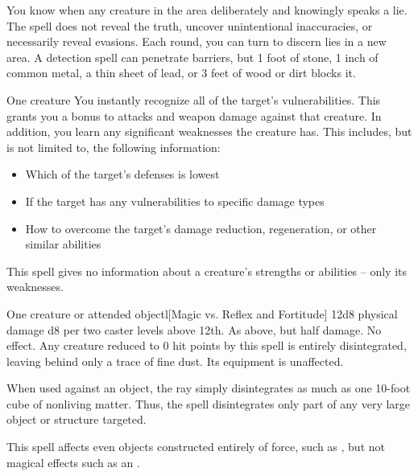 \spellline
\spelleffect You know when any creature in the area deliberately and knowingly speaks a lie. The spell does not reveal the truth, uncover unintentional inaccuracies, or necessarily reveal evasions.
\spellnotes Each round, you can turn to discern lies in a new area. A detection spell can penetrate barriers, but 1 foot of stone, 1 inch of common metal, a thin sheet of lead, or 3 feet of wood or dirt blocks it.

\spellrng{\rngmed}
\begin{spelltarget}{One creature}
    \spelleffect You instantly recognize all of the target's vulnerabilities. This grants you a  bonus to attacks and weapon damage against that creature. In addition, you learn any significant weaknesses the creature has. This includes, but is not limited to, the following information:
    \begin{itemize}
        \item Which of the target's defenses is lowest
        \item If the target has any vulnerabilities to specific damage types
        \item How to overcome the target's damage reduction, regeneration, or other similar abilities
    \end{itemize}
\end{spelltarget}
\spellnotes This spell gives no information about a creature's strengths or abilities -- only its weaknesses.

\spellrng{\rngclose}
\begin{spelltarget}{One creature or attended object}l[Magic vs. Reflex and Fortitude]
    \spellsuccess 12d8 physical damage \add d8 per two caster levels above 12th.
    \spellfailure[Fortitude] As above, but half damage.
    \spellfailure[Reflex] No effect.
    \spelleffect Any creature reduced to 0 hit points by this spell is entirely disintegrated, leaving behind only a trace of fine dust. Its equipment is unaffected.
    \par When used against an object, the ray simply disintegrates as much as one 10-foot cube of nonliving matter. Thus, the spell disintegrates only part of any very large object or structure targeted.
\end{spelltarget}
\spellnotes This spell affects even objects constructed entirely of force, such as , but not magical effects such as an .

